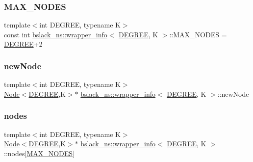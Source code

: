 \subsubsection{\texorpdfstring{M\+A\+X\+\_\+\+N\+O\+D\+ES}{MAX\_NODES}}
{\footnotesize\ttfamily template$<$int D\+E\+G\+R\+EE, typename K$>$ \\
const int \hyperlink{classbslack__ns_1_1wrapper__info}{bslack\+\_\+ns\+::wrapper\+\_\+info}$<$ \hyperlink{brown__sigouin__abtree__kcas_2adapter_8h_a5d88b17d70c985f2f2b8e987037fd6dd}{D\+E\+G\+R\+EE}, K $>$\+::M\+A\+X\+\_\+\+N\+O\+D\+ES = \hyperlink{brown__sigouin__abtree__kcas_2adapter_8h_a5d88b17d70c985f2f2b8e987037fd6dd}{D\+E\+G\+R\+EE}+2\hspace{0.3cm}{\ttfamily [static]}}

\mbox{\label{classbslack__ns_1_1wrapper__info_ac1a673ff65ab005f74a70c12ec36ac77}} 
\subsubsection{\texorpdfstring{new\+Node}{newNode}}
{\footnotesize\ttfamily template$<$int D\+E\+G\+R\+EE, typename K$>$ \\
\hyperlink{structbslack__ns_1_1Node}{Node}$<$\hyperlink{brown__sigouin__abtree__kcas_2adapter_8h_a5d88b17d70c985f2f2b8e987037fd6dd}{D\+E\+G\+R\+EE},K$>$$\ast$ \hyperlink{classbslack__ns_1_1wrapper__info}{bslack\+\_\+ns\+::wrapper\+\_\+info}$<$ \hyperlink{brown__sigouin__abtree__kcas_2adapter_8h_a5d88b17d70c985f2f2b8e987037fd6dd}{D\+E\+G\+R\+EE}, K $>$\+::new\+Node}

\mbox{\label{classbslack__ns_1_1wrapper__info_a2d9b42a29455dc853a04def1360692db}} 
\subsubsection{\texorpdfstring{nodes}{nodes}}
{\footnotesize\ttfamily template$<$int D\+E\+G\+R\+EE, typename K$>$ \\
\hyperlink{structbslack__ns_1_1Node}{Node}$<$\hyperlink{brown__sigouin__abtree__kcas_2adapter_8h_a5d88b17d70c985f2f2b8e987037fd6dd}{D\+E\+G\+R\+EE},K$>$$\ast$ \hyperlink{classbslack__ns_1_1wrapper__info}{bslack\+\_\+ns\+::wrapper\+\_\+info}$<$ \hyperlink{brown__sigouin__abtree__kcas_2adapter_8h_a5d88b17d70c985f2f2b8e987037fd6dd}{D\+E\+G\+R\+EE}, K $>$\+::nodes\mbox{[}\hyperlink{classbslack__ns_1_1wrapper__info_ab5bcd31a5ba96938aa04b6e43da441c4}{M\+A\+X\+\_\+\+N\+O\+D\+ES}\mbox{]}}

